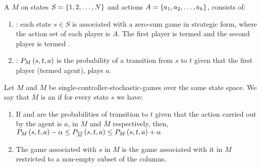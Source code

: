 \begin{defi}
A  $M$ on states $S=\left\{ 1,2,\ldots,N\right\}$ and actions $A=\left\{ a_1,a_2,\ldots,a_k\right\}$, consists of:
\begin{enumerate}
 \item {}: each state $s\in S$ is associated with a zero-sum game in strategic form, where the action set of each player is $A$. The first player is termed  and the second player is termed .
 \item {}: $P_M\left(s,t,a\right)$ is the probability of a transition from $s$ to $t$ given that the first player (termed agent), plays $a$.
\end{enumerate}
\cite{Brafman:1999:NPA:1624312.1624324}
\end{defi}

\begin{defi}
Let $M$ and $\overline{M}$ be single-controller-stochastic-games over the same state space. We say that $\overline{M}$ is an  if for every state $s$ we have:
\begin{enumerate}
 \item If  and  are the probabilities of transition to $t$ given that the action carried out by the agent is $a$, in $M$ and $\overline{M}$ respectively, then, $P_M\left(s,t,a\right)-\alpha\leq P_{\overline{M}}\left(s,t,a\right)\leq P_M\left(s,t,a\right)+\alpha$
 \item The game associated with $s$ in $\overline{M}$ is the game associated with it in $M$ restricted to a non-empty subset of the columns.
\end{enumerate}
\cite{Brafman:1999:NPA:1624312.1624324}
\end{defi}

